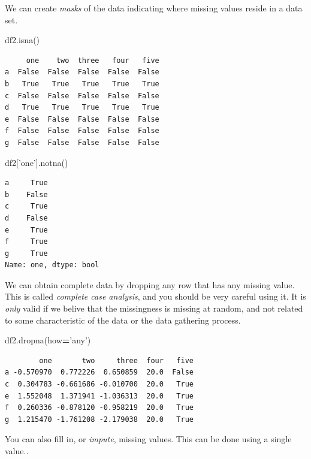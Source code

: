 \documentclass[
  letterpaper,
]{scrbook}
\newenvironment{Shaded}{\begin{snugshade}}{\end{snugshade}}
\newcommand{\NormalTok}[1]{#1}
\newcommand{\OperatorTok}[1]{\textcolor[rgb]{0.81,0.36,0.00}{\textbf{#1}}}
\newcommand{\StringTok}[1]{\textcolor[rgb]{0.31,0.60,0.02}{#1}}
\begin{document}
We can create \emph{masks} of the data indicating where missing values reside in a data set.

\begin{Shaded}
\begin{Highlighting}[]
\NormalTok{df2.isna()}
\end{Highlighting}
\end{Shaded}

\begin{verbatim}
     one    two  three   four   five
a  False  False  False  False  False
b   True   True   True   True   True
c  False  False  False  False  False
d   True   True   True   True   True
e  False  False  False  False  False
f  False  False  False  False  False
g  False  False  False  False  False
\end{verbatim}

\begin{Shaded}
\begin{Highlighting}[]
\NormalTok{df2[}\StringTok{'one'}\NormalTok{].notna()}
\end{Highlighting}
\end{Shaded}

\begin{verbatim}
a     True
b    False
c     True
d    False
e     True
f     True
g     True
Name: one, dtype: bool
\end{verbatim}

We can obtain complete data by dropping any row that has any missing value. This is called \emph{complete case analysis}, and you should be very careful using it. It is \emph{only} valid if we belive that the missingness is missing at random, and not related to some characteristic of the data or the data gathering process.

\begin{Shaded}
\begin{Highlighting}[]
\NormalTok{df2.dropna(how}\OperatorTok{=}\StringTok{'any'}\NormalTok{)}
\end{Highlighting}
\end{Shaded}

\begin{verbatim}
        one       two     three  four   five
a -0.570970  0.772226  0.650859  20.0  False
c  0.304783 -0.661686 -0.010700  20.0   True
e  1.552048  1.371941 -1.036313  20.0   True
f  0.260336 -0.878120 -0.958219  20.0   True
g  1.215470 -1.761208 -2.179038  20.0   True
\end{verbatim}

You can also fill in, or \emph{impute}, missing values. This can be done using a single value..
\end{document}
